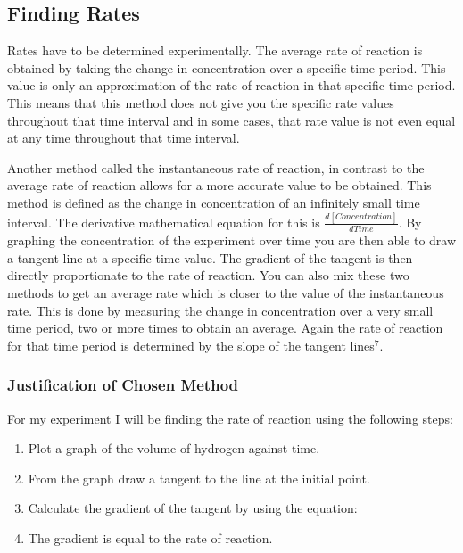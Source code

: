 	\subsection{Finding Rates}


Rates have to be determined experimentally. The average rate of reaction is obtained by taking the change in concentration over a specific time period. This value is only an approximation of the rate of reaction in that specific time period. This means that this method does not give you the specific rate values throughout that time interval and in some cases, that rate value is not even equal at any time throughout that time interval.

Another method called the instantaneous rate of reaction, in contrast to the average rate of reaction allows for a more accurate value to be obtained. This method is defined as the change in concentration of an infinitely small time interval. The derivative mathematical equation for this is $\frac{d[Concentration]}{dTime}$. By graphing the concentration of the experiment over time you are then able to draw a tangent line at a specific time value. The gradient of the tangent is then directly proportionate to the rate of reaction. You can also mix these two methods to get an average rate which is closer to the value of the instantaneous rate. This is done by measuring the change in concentration over a very small time period, two or more times to obtain an average. Again the rate of reaction for that time period is determined by the slope of the tangent lines$^7$.





		\subsubsection{Justification of Chosen Method}

For my experiment I will be finding the rate of reaction using the following steps:

\begin{enumerate}
\item Plot a graph of the volume of hydrogen against time.
\item From the graph draw a tangent to the line at the initial point.
\item Calculate the gradient of the tangent by using the equation: 
\item The gradient is equal to the rate of reaction.
\end{enumerate}

